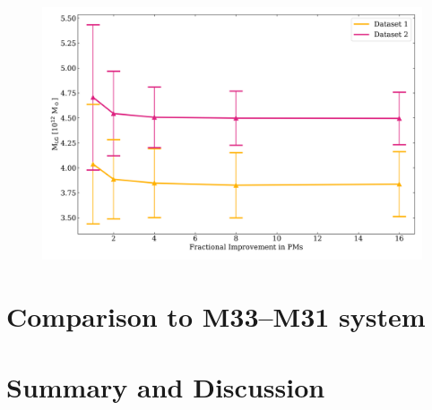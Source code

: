 \documentclass[twocolumn]{aastex631}
\begin{document}
\begin{figure}[htb]
    \centering
    \includegraphics[width=\columnwidth]{analyze-runs-MvsPM.png}
    \caption{\label{fig:contour}
    }
\end{figure}


\section{Comparison to M33--M31 system}

\section{Summary and Discussion}
\label{sec:discussion}




{}

\end{document}
